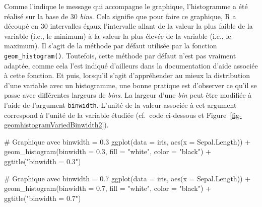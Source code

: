 \documentclass[
  letterpaper,
]{book}
\newenvironment{Shaded}{\begin{snugshade}}{\end{snugshade}}
\newcommand{\AttributeTok}[1]{\textcolor[rgb]{0.40,0.45,0.13}{#1}}
\newcommand{\CommentTok}[1]{\textcolor[rgb]{0.37,0.37,0.37}{#1}}
\newcommand{\FloatTok}[1]{\textcolor[rgb]{0.68,0.00,0.00}{#1}}
\newcommand{\FunctionTok}[1]{\textcolor[rgb]{0.28,0.35,0.67}{#1}}
\newcommand{\NormalTok}[1]{\textcolor[rgb]{0.00,0.23,0.31}{#1}}
\newcommand{\SpecialCharTok}[1]{\textcolor[rgb]{0.37,0.37,0.37}{#1}}
\newcommand{\StringTok}[1]{\textcolor[rgb]{0.13,0.47,0.30}{#1}}
\begin{document}
Comme l'indique le message qui accompagne le graphique, l'histogramme a
été réalisé sur la base de 30 \emph{bins}. Cela signifie que pour faire
ce graphique, R a découpé en 30 intervalles égaux l'intervalle allant de
la valeur la plus faible de la variable (i.e., le minimum) à la valeur
la plus élevée de la variable (i.e., le maximum). Il s'agit de la
méthode par défaut utilisée par la fonction \texttt{geom\_histogram()}.
Toutefois, cette méthode par défaut n'est pas vraiment adaptée, comme
cela l'est indiqué d'ailleurs dans la documentation d'aide associée à
cette fonction. Et puis, lorsqu'il s'agit d'appréhender au mieux la
distribution d'une variable avec un histogramme, une bonne pratique est
d'observer ce qu'il se passe avec différentes largeurs de \emph{bins}.
La largeur d'une \emph{bin} peut être modifiée à l'aide de l'argument
\texttt{binwidth}. L'unité de la valeur associée à cet argument
correspond à l'unité de la variable étudiée (cf.~code ci-dessous et
Figure~\ref{fig-geomhistogramVariedBinwidth2}).

\begin{Shaded}
\begin{Highlighting}[]
\CommentTok{\# Graphique avec binwidth = 0.3}
\FunctionTok{ggplot}\NormalTok{(}\AttributeTok{data =}\NormalTok{ iris, }\FunctionTok{aes}\NormalTok{(}\AttributeTok{x =}\NormalTok{ Sepal.Length)) }\SpecialCharTok{+}
  \FunctionTok{geom\_histogram}\NormalTok{(}\AttributeTok{binwidth  =} \FloatTok{0.3}\NormalTok{,}
                 \AttributeTok{fill =} \StringTok{"white"}\NormalTok{,}
                 \AttributeTok{color =} \StringTok{"black"}\NormalTok{) }\SpecialCharTok{+}
  \FunctionTok{ggtitle}\NormalTok{(}\StringTok{"binwidth = 0.3"}\NormalTok{)}

\CommentTok{\# Graphique avec binwidth = 0.7}
\FunctionTok{ggplot}\NormalTok{(}\AttributeTok{data =}\NormalTok{ iris, }\FunctionTok{aes}\NormalTok{(}\AttributeTok{x =}\NormalTok{ Sepal.Length)) }\SpecialCharTok{+}
  \FunctionTok{geom\_histogram}\NormalTok{(}\AttributeTok{binwidth  =} \FloatTok{0.7}\NormalTok{,}
                 \AttributeTok{fill =} \StringTok{"white"}\NormalTok{,}
                 \AttributeTok{color =} \StringTok{"black"}\NormalTok{) }\SpecialCharTok{+}
  \FunctionTok{ggtitle}\NormalTok{(}\StringTok{"binwidth = 0.7"}\NormalTok{)}
\end{Highlighting}
\end{Shaded}
\end{document}
